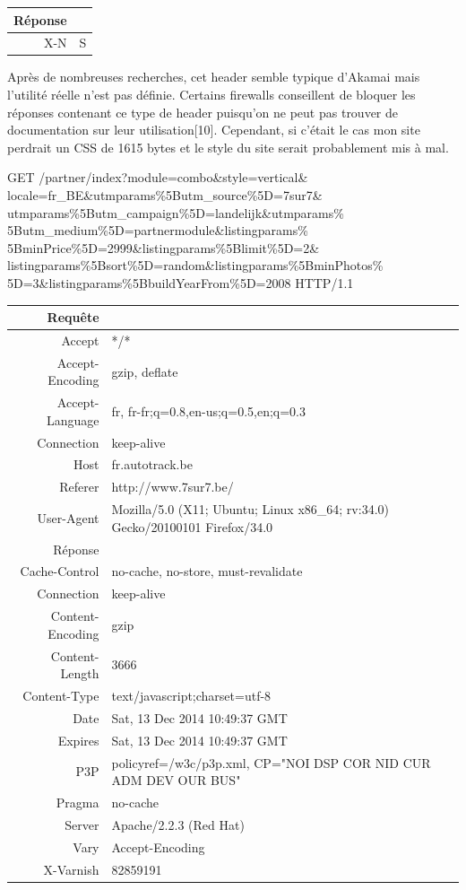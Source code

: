 \documentclass[conference]{IEEEtran}
\begin{document}
\begin{tabular}{|r|p{5cm}|}
  \hline
  Réponse & \\
  \hline
  X-N & S \\
  \hline
\end{tabular}

Après de nombreuses recherches, cet header semble typique d'Akamai mais l'utilité réelle n'est pas définie. Certains firewalls conseillent de bloquer les réponses contenant ce type de header puisqu'on ne peut pas trouver de documentation sur leur utilisation[10]. Cependant, si c'était le cas mon site perdrait un CSS de 1615 bytes et le style du site serait probablement mis à mal.

GET /partner/index?module=combo\&style=vertical\&
locale=fr\_BE\&utmparams\%5Butm\_source\%5D=7sur7\&
utmparams\%5Butm\_campaign\%5D=landelijk\&utmparams\%
5Butm\_medium\%5D=partnermodule\&listingparams\%
5BminPrice\%5D=2999\&listingparams\%5Blimit\%5D=2\&
listingparams\%5Bsort\%5D=random\&listingparams\%5BminPhotos\%
5D=3\&listingparams\%5BbuildYearFrom\%5D=2008 HTTP/1.1

\begin{tabular}{|r|p{5cm}|}
  \hline
  Requête & \\
  \hline
  Accept & */* \\
  Accept-Encoding & gzip, deflate \\
  Accept-Language & fr, fr-fr;q=0.8,en-us;q=0.5,en;q=0.3 \\
  Connection & keep-alive \\
  Host & fr.autotrack.be \\
  Referer & http://www.7sur7.be/ \\
  User-Agent & Mozilla/5.0 (X11; Ubuntu; Linux x86\_64; rv:34.0) Gecko/20100101 Firefox/34.0 \\
  \hline
  Réponse & \\
  \hline
  Cache-Control & no-cache, no-store, must-revalidate \\
  Connection & keep-alive \\
  Content-Encoding & gzip \\
  Content-Length & 3666 \\
  Content-Type & text/javascript;charset=utf-8 \\
  Date & Sat, 13 Dec 2014 10:49:37 GMT \\
  Expires & Sat, 13 Dec 2014 10:49:37 GMT \\
  P3P & policyref=/w3c/p3p.xml, CP="NOI DSP COR NID CUR ADM DEV OUR BUS" \\
  Pragma & no-cache \\
  Server & Apache/2.2.3 (Red Hat) \\
  Vary & Accept-Encoding \\
  X-Varnish & 82859191 \\
  \hline
\end{tabular}
\end{document}
